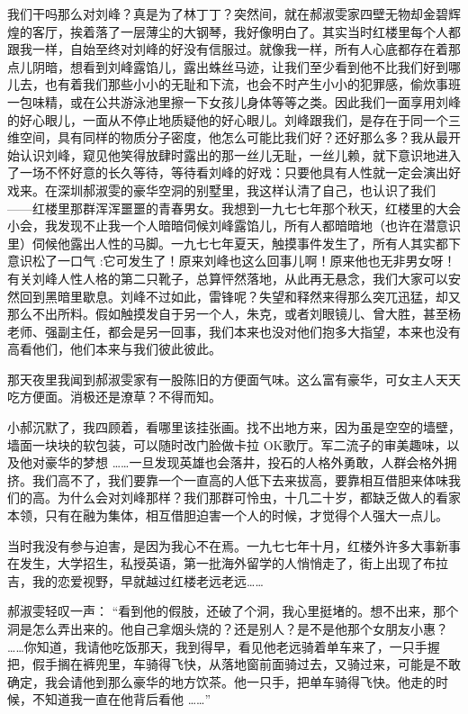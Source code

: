 \documentclass[12pt,twoside,openany]{book}
\begin{document}
我们干吗那么对刘峰？真是为了林丁丁？突然间，就在郝淑雯家四壁无物却金碧辉煌的客厅，挨着落了一层薄尘的大钢琴，我好像明白了。其实当时红楼里每个人都跟我一样，自始至终对刘峰的好没有信服过。就像我一样，所有人心底都存在着那点儿阴暗，想看到刘峰露馅儿，露出蛛丝马迹，让我们至少看到他不比我们好到哪儿去，也有着我们那些小小的无耻和下流，也会不时产生小小的犯罪感，偷炊事班一包味精，或在公共游泳池里擦一下女孩儿身体等等之类。因此我们一面享用刘峰的好心眼儿，一面从不停止地质疑他的好心眼儿。刘峰跟我们，是存在于同一个三维空间，具有同样的物质分子密度，他怎么可能比我们好？还好那么多？我从最开始认识刘峰，窥见他笑得放肆时露出的那一丝儿无耻，一丝儿赖，就下意识地进入了一场不怀好意的长久等待，等待看刘峰的好戏：只要他具有人性就一定会演出好戏来。在深圳郝淑雯的豪华空洞的别墅里，我这样认清了自己，也认识了我们 ——红楼里那群浑浑噩噩的青春男女。我想到一九七七年那个秋天，红楼里的大会小会，我发现不止我一个人暗暗伺候刘峰露馅儿，所有人都暗暗地（也许在潜意识里）伺候他露出人性的马脚。一九七七年夏天，触摸事件发生了，所有人其实都下意识松了一口气 :它可发生了！原来刘峰也这么回事儿啊！原来他也无非男女呀！有关刘峰人性人格的第二只靴子，总算怦然落地，从此再无悬念，我们大家可以安然回到黑暗里歇息。刘峰不过如此，雷锋呢？失望和释然来得那么突兀迅猛，却又那么不出所料。假如触摸发自于另一个人，朱克，或者刘眼镜儿、曾大胜，甚至杨老师、强副主任，都会是另一回事，我们本来也没对他们抱多大指望，本来也没有高看他们，他们本来与我们彼此彼此。

那天夜里我闻到郝淑雯家有一股陈旧的方便面气味。这么富有豪华，可女主人天天吃方便面。消极还是潦草？不得而知。

小郝沉默了，我四顾着，看哪里该挂张画。找不出地方来，因为虽是空空的墙壁，墙面一块块的软包装，可以随时改门脸做卡拉 OK歌厅。军二流子的审美趣味，以及他对豪华的梦想 ……一旦发现英雄也会落井，投石的人格外勇敢，人群会格外拥挤。我们高不了，我们要靠一个一直高的人低下去来拔高，要靠相互借胆来体味我们的高。为什么会对刘峰那样？我们那群可怜虫，十几二十岁，都缺乏做人的看家本领，只有在融为集体，相互借胆迫害一个人的时候，才觉得个人强大一点儿。

当时我没有参与迫害，是因为我心不在焉。一九七七年十月，红楼外许多大事新事在发生，大学招生，私授英语，第一批海外留学的人悄悄走了，街上出现了布拉吉，我的恋爱视野，早就越过红楼老远老远……

郝淑雯轻叹一声： “看到他的假肢，还破了个洞，我心里挺堵的。想不出来，那个洞是怎么弄出来的。他自己拿烟头烧的？还是别人？是不是他那个女朋友小惠？ ……你知道，我请他吃饭那天，我到得早，看见他老远骑着单车来了，一只手握把，假手搁在裤兜里，车骑得飞快，从落地窗前面骑过去，又骑过来，可能是不敢确定，我会请他到那么豪华的地方饮茶。他一只手，把单车骑得飞快。他走的时候，不知道我一直在他背后看他 ……”
\end{document}
